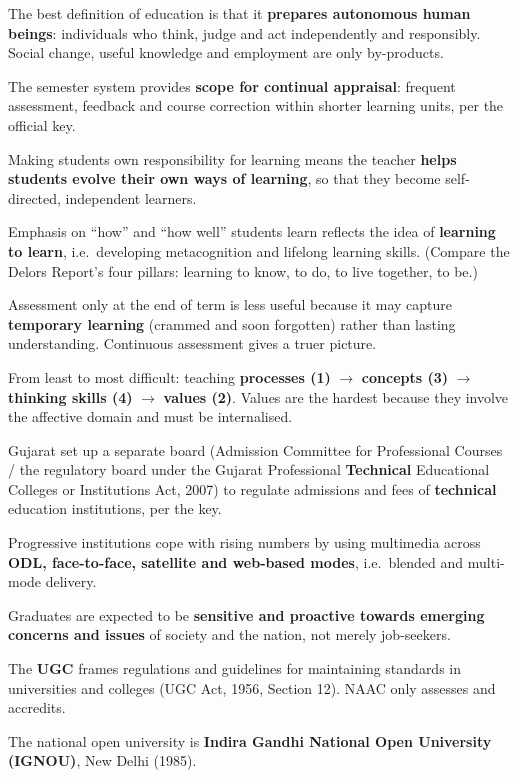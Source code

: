 The best definition of education is that it \textbf{prepares autonomous human beings}: individuals who think, judge and act independently and responsibly. Social change, useful knowledge and employment are only by-products.

The semester system provides \textbf{scope for continual appraisal}: frequent assessment, feedback and course correction within shorter learning units, per the official key.

Making students own responsibility for learning means the teacher \textbf{helps students evolve their own ways of learning}, so that they become self-directed, independent learners.

Emphasis on ``how'' and ``how well'' students learn reflects the idea of \textbf{learning to learn}, i.e.\ developing metacognition and lifelong learning skills. (Compare the Delors Report's four pillars: learning to know, to do, to live together, to be.)

Assessment only at the end of term is less useful because it may capture \textbf{temporary learning} (crammed and soon forgotten) rather than lasting understanding. Continuous assessment gives a truer picture.

From least to most difficult: teaching \textbf{processes (1)} $\rightarrow$ \textbf{concepts (3)} $\rightarrow$ \textbf{thinking skills (4)} $\rightarrow$ \textbf{values (2)}. Values are the hardest because they involve the affective domain and must be internalised.

Gujarat set up a separate board (Admission Committee for Professional Courses / the regulatory board under the Gujarat Professional \textbf{Technical} Educational Colleges or Institutions Act, 2007) to regulate admissions and fees of \textbf{technical} education institutions, per the key.

Progressive institutions cope with rising numbers by using multimedia across \textbf{ODL, face-to-face, satellite and web-based modes}, i.e.\ blended and multi-mode delivery.

Graduates are expected to be \textbf{sensitive and proactive towards emerging concerns and issues} of society and the nation, not merely job-seekers.

The \textbf{UGC} frames regulations and guidelines for maintaining standards in universities and colleges (UGC Act, 1956, Section 12). NAAC only assesses and accredits.

The national open university is \textbf{Indira Gandhi National Open University (IGNOU)}, New Delhi (1985).

